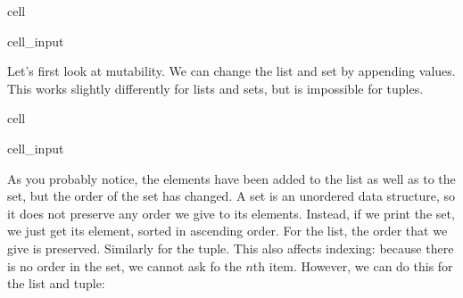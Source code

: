 \documentclass[letterpaper,10pt,english]{jupyterBook}
\begin{document}
\begin{sphinxuseclass}{cell}\begin{sphinxVerbatimInput}

\begin{sphinxuseclass}{cell_input}
\begin{sphinxVerbatim}[commandchars=\\\{\}]
    
  \PYG{p}{[}  \PYG{p}{]}
    
\end{sphinxVerbatim}

\end{sphinxuseclass}\end{sphinxVerbatimInput}

\end{sphinxuseclass}
\sphinxAtStartPar
Let’s first look at mutability. We can change the list and set by appending values. This works slightly differently for lists and sets, but is impossible for tuples.

\begin{sphinxuseclass}{cell}\begin{sphinxVerbatimInput}

\begin{sphinxuseclass}{cell_input}
\begin{sphinxVerbatim}[commandchars=\\\{\}]
  \PYG{p}{[}  \PYG{p}{]}

    
\end{sphinxVerbatim}

\end{sphinxuseclass}\end{sphinxVerbatimInput}

\end{sphinxuseclass}
\sphinxAtStartPar
As you probably notice, the elements have been added to the list as well as to the set, but the order of the set has changed. A set is an unordered data structure, so it does not preserve any order we give to its elements. Instead, if we print the set, we just get its element, sorted in ascending order. For the list, the order that we give is preserved. Similarly for the tuple. This also affects indexing: because there is no order in the set, we cannot ask fo the \(n\)th item. However, we can do this for the list and tuple:
\end{document}
